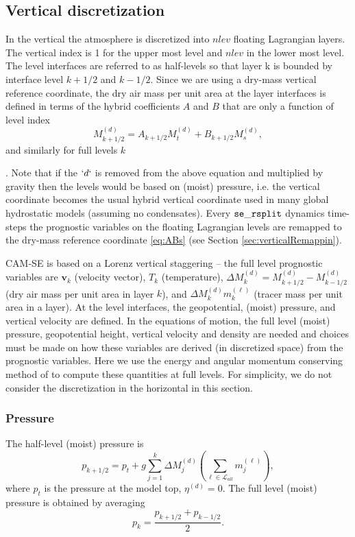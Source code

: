 \documentclass{agujournal}
\begin{document}
{\subsection{Vertical discretization}
In the vertical the atmosphere is discretized into $nlev$ floating Lagrangian layers. The vertical index is 1 for the upper most level and $nlev$ in the lower most level. The level interfaces are referred to as half-levels so that layer k is bounded by interface level $k+1/2$ and $k-1/2$. Since we are using a dry-mass vertical reference coordinate, the dry air mass per unit area at the layer interfaces is defined in terms of the hybrid coefficients $A$ and $B$
 that are only a function of level index
\begin{equation}
M^{(d)}_{k+1/2}=A_{k+1/2}M^{(d)}_t+B_{k+1/2}M_s^{(d)},\label{eq:ABs}
\end{equation}
and similarly for full levels $k$ }. Note that if the $`d`$ is removed from the above equation and multiplied by gravity then the levels would be based on (moist) pressure, i.e. the vertical coordinate becomes the usual hybrid vertical coordinate used in many global hydrostatic models (assuming no condensates). Every ${\tt{se\_rsplit}}$ dynamics time-steps the prognostic variables on the floating Lagrangian levels are remapped to the dry-mass reference coordinate \eqref{eq:ABs} (see Section \ref{sec:verticalRemappin}). 

CAM-SE is based on a Lorenz vertical staggering -- the full level prognostic variables are $\mathbf{v}_k$ (velocity vector), $T_k$ (temperature), $\Delta M^{(d)}_k=M^{(d)}_{k+1/2}-M^{(d)}_{k-1/2}$ (dry air mass per unit area in layer $k$), and $\Delta M^{(d)}_k m_k^{(\ell)}$ (tracer mass per unit area in a layer). At the level interfaces, the geopotential, (moist) pressure, and vertical velocity are defined. In the equations of motion, the full level (moist) pressure, geopotential height, vertical velocity and density are needed and choices must be made on how these variables are derived (in discretized space) from the prognostic variables. Here we use the energy and angular momentum conserving method of \citet{SB1981MWR} to compute these quantities at full levels. For simplicity, we do not consider the discretization in the horizontal in this section.
\subsubsection{Pressure}\label{sec:pk}
The half-level (moist) pressure is
\begin{equation}
p_{k+1/2}=p_t+g\sum_{j=1}^{k}\Delta M^{(d)}_j \left(\sum_{\ell \in \mathcal{L}_{all}} m_j^{(\ell)}\right),\label{eq:halfpfull}
\end{equation}
where $p_t$ is the pressure at the model top, $\eta^{(d)}=0$.
The full level (moist) pressure is obtained by averaging \citep{SB1981MWR}
\begin{equation}
p_k=\frac{p_{k+1/2}+p_{k-1/2}}{2}.\label{eq:pk}
\end{equation}
\end{document}
